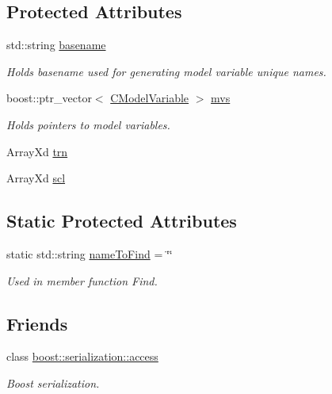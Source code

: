 \subsection*{Protected Attributes}
\begin{DoxyCompactItemize}
\item 
std\-::string \hyperlink{class_go_s_u_m_1_1_c_model_variables_a3e0a177e926f2512b4499a47ecc9c957}{basename}
\begin{DoxyCompactList}\small\item\em Holds basename used for generating model variable unique names. \end{DoxyCompactList}\item 
boost\-::ptr\-\_\-vector$<$ \hyperlink{class_go_s_u_m_1_1_c_model_variable}{C\-Model\-Variable} $>$ \hyperlink{class_go_s_u_m_1_1_c_model_variables_a9ce0daf443666eb920bbbbdee00e1e37}{mvs}
\begin{DoxyCompactList}\small\item\em Holds pointers to model variables. \end{DoxyCompactList}\item 
Array\-Xd \hyperlink{class_go_s_u_m_1_1_c_model_variables_a44c359c9aeda8913e9c93bdf133638dd}{trn}
\item 
Array\-Xd \hyperlink{class_go_s_u_m_1_1_c_model_variables_a82725532f90f4b4c6c6bd6b4c25d20c3}{scl}
\end{DoxyCompactItemize}
\subsection*{Static Protected Attributes}
\begin{DoxyCompactItemize}
\item 
static std\-::string \hyperlink{class_go_s_u_m_1_1_c_model_variables_aa295a3899598dab50afc56434eb7ace4}{name\-To\-Find} = \char`\"{}\char`\"{}
\begin{DoxyCompactList}\small\item\em Used in member function Find. \end{DoxyCompactList}\end{DoxyCompactItemize}
\subsection*{Friends}
\begin{DoxyCompactItemize}
\item 
class \hyperlink{class_go_s_u_m_1_1_c_model_variables_ac98d07dd8f7b70e16ccb9a01abf56b9c}{boost\-::serialization\-::access}
\begin{DoxyCompactList}\small\item\em Boost serialization. \end{DoxyCompactList}\end{DoxyCompactItemize}


